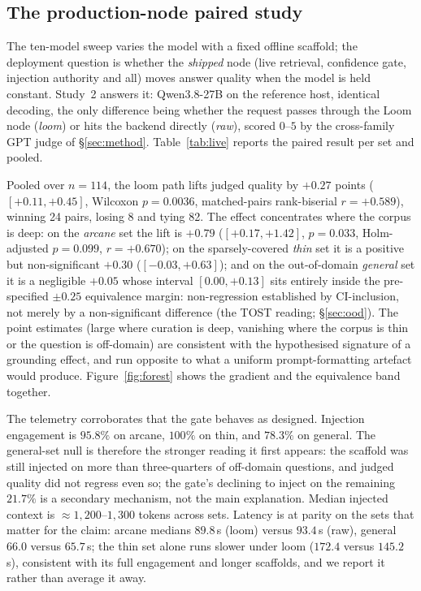\documentclass[10pt,twocolumn]{article}
\begin{document}
\subsection{The production-node paired study}\label{sec:live}
The ten-model sweep varies the model with a fixed offline scaffold; the deployment question is whether
the \emph{shipped} node (live retrieval, confidence gate, injection authority and all) moves answer
quality when the model is held constant. Study~2 answers it: Qwen3.8-27B on the reference host,
identical decoding, the only difference being whether the request passes through the Loom node
(\emph{loom}) or hits the backend directly (\emph{raw}), scored $0$--$5$ by the cross-family GPT judge
of \S\ref{sec:method}. Table~\ref{tab:live} reports the paired result per set and pooled.

Pooled over $n=114$, the loom path lifts judged quality by $\mathbf{+0.27}$ points
($[+0.11,+0.45]$, Wilcoxon $p=0.0036$, matched-pairs rank-biserial $r=+0.589$), winning 24 pairs,
losing 8 and tying 82. The effect concentrates where the corpus is deep: on the \emph{arcane} set the
lift is $\mathbf{+0.79}$ ($[+0.17,+1.42]$, $p=0.033$, Holm-adjusted $p=0.099$, $r=+0.670$); on the
sparsely-covered \emph{thin} set it is a positive but non-significant $+0.30$ ($[-0.03,+0.63]$); and
on the out-of-domain \emph{general} set it is a negligible $+0.05$ whose interval $[0.00,+0.13]$ sits
entirely inside the pre-specified $\pm0.25$ equivalence margin: non-regression established by
CI-inclusion, not merely by a non-significant difference (the TOST reading; \S\ref{sec:ood}). The
point estimates (large where curation is deep, vanishing where the corpus is thin or the question is
off-domain) are consistent with the hypothesised signature of a grounding effect, and run opposite
to what a uniform prompt-formatting artefact would produce. Figure~\ref{fig:forest} shows the
gradient and the equivalence band together.



The telemetry corroborates that the gate behaves as designed. Injection engagement is $95.8\%$ on
arcane, $100\%$ on thin, and $78.3\%$ on general. The general-set null is therefore the stronger
reading it first appears: the scaffold was still injected on more than three-quarters of off-domain
questions, and judged quality did not regress even so; the gate's declining to inject on the remaining
$21.7\%$ is a secondary mechanism, not the main explanation. Median injected context is
$\approx1{,}200$--$1{,}300$ tokens across sets. Latency is at parity on the sets that matter for the
claim: arcane medians $89.8$\,s (loom) versus $93.4$\,s (raw), general $66.0$ versus $65.7$\,s; the
thin set alone runs slower under loom ($172.4$ versus $145.2$\,s), consistent with its full engagement
and longer scaffolds, and we report it rather than average it away.
\end{document}
